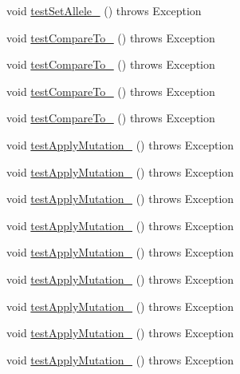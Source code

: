 \begin{DoxyCompactItemize}
\item 
void \hyperlink{classorg_1_1jgap_1_1impl_1_1_set_gene_test_a92cd7d30034f02b218345a66d923afef}{test\-Set\-Allele\-\_} ()  throws Exception 
\item 
void \hyperlink{classorg_1_1jgap_1_1impl_1_1_set_gene_test_a7c58174a482a7def020fdbb4f5f4075c}{test\-Compare\-To\-\_} ()  throws Exception 
\item 
void \hyperlink{classorg_1_1jgap_1_1impl_1_1_set_gene_test_a0e037646dd4c1f6f0611a0ae4b9f678c}{test\-Compare\-To\-\_} ()  throws Exception 
\item 
void \hyperlink{classorg_1_1jgap_1_1impl_1_1_set_gene_test_a55146ec4755292518f1c6da9c76d14da}{test\-Compare\-To\-\_} ()  throws Exception 
\item 
void \hyperlink{classorg_1_1jgap_1_1impl_1_1_set_gene_test_a4abba594c0f5faada68abeb4e4f62a34}{test\-Compare\-To\-\_} ()  throws Exception 
\item 
void \hyperlink{classorg_1_1jgap_1_1impl_1_1_set_gene_test_a60f7bc9999e47d6f50613453e0b8c24f}{test\-Apply\-Mutation\-\_} ()  throws Exception 
\item 
void \hyperlink{classorg_1_1jgap_1_1impl_1_1_set_gene_test_acba8c64524a70905be1d9cb624b69a50}{test\-Apply\-Mutation\-\_} ()  throws Exception 
\item 
void \hyperlink{classorg_1_1jgap_1_1impl_1_1_set_gene_test_a42a6bcdb02d6cdb49e81873c8f57aa9e}{test\-Apply\-Mutation\-\_} ()  throws Exception 
\item 
void \hyperlink{classorg_1_1jgap_1_1impl_1_1_set_gene_test_a41e2d57a098dcfc8358e50f7117efbcf}{test\-Apply\-Mutation\-\_} ()  throws Exception 
\item 
void \hyperlink{classorg_1_1jgap_1_1impl_1_1_set_gene_test_a61299deee4443306b6bb70a38d06421e}{test\-Apply\-Mutation\-\_} ()  throws Exception 
\item 
void \hyperlink{classorg_1_1jgap_1_1impl_1_1_set_gene_test_a66e69e56ea6f1c1487ca3e8e6d3afe57}{test\-Apply\-Mutation\-\_} ()  throws Exception 
\item 
void \hyperlink{classorg_1_1jgap_1_1impl_1_1_set_gene_test_a4c9fa1872ee88ff716c69fcf6918d9a3}{test\-Apply\-Mutation\-\_} ()  throws Exception 
\item 
void \hyperlink{classorg_1_1jgap_1_1impl_1_1_set_gene_test_adf9d51d24135126907d5fccacd6ce334}{test\-Apply\-Mutation\-\_} ()  throws Exception 
\item 
void \hyperlink{classorg_1_1jgap_1_1impl_1_1_set_gene_test_ab98e5519db6de37dddd24cc855e9ea37}{test\-Apply\-Mutation\-\_} ()  throws Exception 

\end{DoxyCompactItemize}
